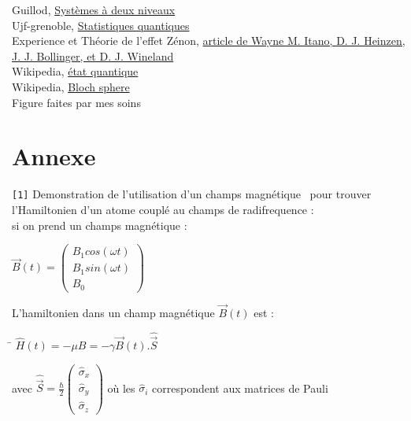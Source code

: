 \documentclass[11pt]{article}
\begin{document}
\begin{thebibliography}{MMM99}
 Guillod, \href{https://guillod.org/teaching/mecanique-quantique1/Cours-systeme-2niveaux.pdf}{Systèmes à deux niveaux}\\

 Ujf-grenoble, \href{https://www-fourier.ujf-grenoble.fr/~faure/enseignement/meca_q/cours_chap9.pdf}{Statistiques quantiques}\\

 Experience et Théorie de l'effet Zénon, \href{https://goldphysics.unm.edu/phys521/features/zeno_PhsRevA41_2299.pdf}{article de Wayne M. Itano, D. J. Heinzen, J. J. Bollinger, et D. J. Wineland}\\

 Wikipedia, \href{https://fr.wikipedia.org/wiki/%C3%89tat_quantique}{état quantique}\\

 Wikipedia, \href{https://en.wikipedia.org/wiki/Bloch_sphere}{Bloch sphere}
\\
\vspace{0.7cm}
Figure faites par mes soins
\end{thebibliography}

\newpage

\section{Annexe}

{\texttt{[1]}}\label{sec:B} Demonstration de l'utilisation d'un champs magnétique~\cite{G} pour trouver l'Hamiltonien d'un atome couplé au champs de radifrequence :\\
\vspace{0.3cm}
si on prend un champs magnétique :
\begin{tabbing}
    \qquad $\Vec{B}(t) = \begin{pmatrix}
B_1 cos(\omega t)  \\
B_1 sin(\omega t) \\
B_0
\end{pmatrix}$ 
\end{tabbing}

L'hamiltonien dans un champ magnétique $\Vec{B}(t)$ est :\\
\begin{tabbing}
    \qquad \= $\hat H(t) = - \mu B = - \gamma \Vec{B}(t).\hat{\Vec{S}}$
\end{tabbing}

avec $\hat{\Vec{S}} = \frac{\hbar}{2} \begin{pmatrix}
\hat \sigma_x  \\
\hat \sigma_y \\
\hat \sigma_z
\end{pmatrix}$ où les $\hat \sigma_i$ correspondent aux matrices de Pauli
\end{document}

